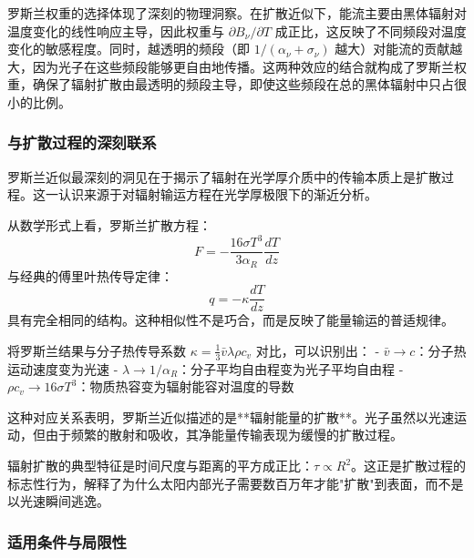 \begin{derivationnote}[罗斯兰权重的物理直觉]
罗斯兰权重的选择体现了深刻的物理洞察。在扩散近似下，能流主要由黑体辐射对温度变化的线性响应主导，因此权重与 $\partial B_\nu/\partial T$ 成正比，这反映了不同频段对温度变化的敏感程度。同时，越透明的频段（即 $1/(\alpha_\nu+\sigma_\nu)$ 越大）对能流的贡献越大，因为光子在这些频段能够更自由地传播。这两种效应的结合就构成了罗斯兰权重，确保了辐射扩散由最透明的频段主导，即使这些频段在总的黑体辐射中只占很小的比例。
\end{derivationnote}

\subsubsection*{与扩散过程的深刻联系}

罗斯兰近似最深刻的洞见在于揭示了辐射在光学厚介质中的传输本质上是扩散过程。这一认识来源于对辐射输运方程在光学厚极限下的渐近分析。



从数学形式上看，罗斯兰扩散方程：
\[
F = -\frac{16\sigma T^3}{3\alpha_R} \frac{dT}{dz}
\]
与经典的傅里叶热传导定律：
\[
q = -\kappa \frac{dT}{dz}
\]
具有完全相同的结构。这种相似性不是巧合，而是反映了能量输运的普适规律。

将罗斯兰结果与分子热传导系数 $\kappa = \frac{1}{3} \bar{v} \lambda \rho c_v$ 对比，可以识别出：
- $\bar{v} \rightarrow c$：分子热运动速度变为光速
- $\lambda \rightarrow 1/\alpha_R$：分子平均自由程变为光子平均自由程  
- $\rho c_v \rightarrow 16\sigma T^3$：物质热容变为辐射能容对温度的导数

这种对应关系表明，罗斯兰近似描述的是**辐射能量的扩散**。光子虽然以光速运动，但由于频繁的散射和吸收，其净能量传输表现为缓慢的扩散过程。

辐射扩散的典型特征是时间尺度与距离的平方成正比：$\tau \propto R^2$。这正是扩散过程的标志性行为，解释了为什么太阳内部光子需要数百万年才能"扩散"到表面，而不是以光速瞬间逃逸。

\subsubsection*{适用条件与局限性}

